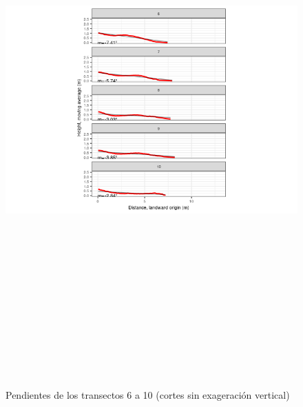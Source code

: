 \documentclass[11pt,]{article}
\begin{document}
\begin{figure}
\centering
\includegraphics[height=8.33333in]{panels-2.png}
\caption{Pendientes de los transectos 6 a 10 (cortes sin exageración
vertical) \label{transectos-perfil2}}
\end{figure}
\end{document}
